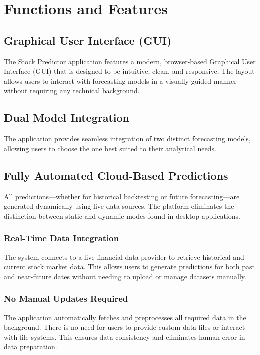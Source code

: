 %
%

\chapter{Functions and Features}

\section{Graphical User Interface (GUI)}
The Stock Predictor application features a modern, browser-based Graphical User Interface (GUI) that is designed to be intuitive, clean, and responsive. The layout allows users to interact with forecasting models in a visually guided manner without requiring any technical background.


\section{Dual Model Integration}
The application provides seamless integration of two distinct forecasting models, allowing users to choose the one best suited to their analytical needs.

\section{Fully Automated Cloud-Based Predictions}
All predictions—whether for historical backtesting or future forecasting—are generated dynamically using live data sources. The platform eliminates the distinction between static and dynamic modes found in desktop applications.

\subsection{Real-Time Data Integration}
The system connects to a live financial data provider to retrieve historical and current stock market data. This allows users to generate predictions for both past and near-future dates without needing to upload or manage datasets manually.

\subsection{No Manual Updates Required}
The application automatically fetches and preprocesses all required data in the background. There is no need for users to provide custom data files or interact with file systems. This ensures data consistency and eliminates human error in data preparation.

